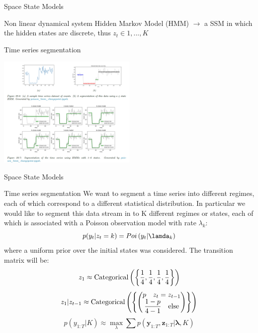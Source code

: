 \documentclass[11pt]{beamer}
\begin{document}
\begin{frame}{Space State Models  \cite{pml2Book}}
\begin{alertblock}{Non linear dynamical system}
Hidden Markov Model (HMM) $\rightarrow$ a SSM in which the hidden states are discrete, thus $z_{t}\in {1,...,K}$
\end{alertblock}
\begin{exampleblock}{Time series segmentation}
\begin{center}
     \includegraphics[width=0.5\textwidth]{Pic/time_series_segmentation.png}
    \end{center}
    \end{exampleblock}
\end{frame}

\begin{frame}{Space State Models  \cite{pml2Book}}
\small
\begin{exampleblock}{Time series segmentation}
We want to segment a time series into different regimes, each of which correspond to a different statistical distribution. In particular we would like to segment this data stream in to K different regimes or states, each of which is associated with a Poisson observation model with rate $\lambda_{k}$:
\begin{equation*}
p(y_{t}|z_{t}=k)= Poi\left(y_{t}|\lamda_{k}\right)
\end{equation*}
where a uniform prior over the initial states was considered. The transition matrix will be:
\begin{equation*}
z_{1}\approx \textnormal{Categorical}\left( \left\lbrace \dfrac{1}{4},\dfrac{1}{4},\dfrac{1}{4},\dfrac{1}{4}\right\rbrace \right)
\end{equation*}
\begin{equation*}
z_{1}|z_{t-1}\approx \textnormal{Categorical}\left( \left\lbrace  \begin{pmatrix} p  \quad z_{t}=z_{t-1} \\ \dfrac{1-p}{4-1}  \quad \textnormal{else}  \end{pmatrix}  \right\rbrace \right)
\end{equation*}
\begin{equation*}
p(y_{1:T}|K)\approx \max_{\lambda}\sum p\left( \bm{y}_{1:T},\bm{z}_{1:T}| \bm{\lambda},K \right)
\end{equation*}
\end{exampleblock}
\end{frame}
\end{document}
